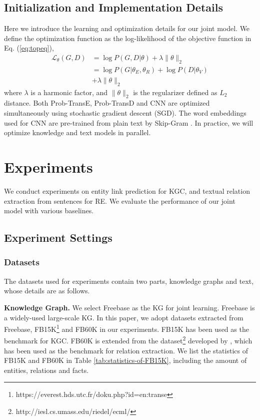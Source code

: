 \documentclass[letterpaper]{article} %
\begin{document}
\subsection{Initialization and Implementation Details}
\label{sec:detail}
Here we introduce the learning and optimization details for our joint model. We define the optimization function as the log-likelihood of the objective function in Eq. (\ref{eq:topeq}),
\begin{align}
\mathcal{L}_{\theta}(G, D) & = \log P(G,D|{\theta}) + \lambda \lVert \theta \rVert_2 \\\nonumber
 & = \log P(G|{\theta_E, \theta_R}) + \log P(D|{\theta_V}) \\\nonumber
 & + \lambda \lVert \theta \rVert_2
\end{align}
where $\lambda$ is a harmonic factor, and $\lVert \theta \rVert_2$ is the regularizer defined as $L_2$ distance. Both Prob-TransE, Prob-TransD and CNN are optimized simultaneously using stochastic gradient descent (SGD). The word embeddings used for CNN are pre-trained from plain text by Skip-Gram \cite{mikolov2013efficient}. In practice, we will optimize knowledge and text models in parallel. 


\section{Experiments}
\label{sec:experiments}

We conduct experiments on entity link prediction for KGC, and textual relation extraction from sentences for RE. We evaluate the performance of our joint model with various baselines. 


\subsection{Experiment Settings}



\subsubsection{Datasets}

The datasets used for experiments contain two parts, knowledge graphs and text, whose details are as follows.

\textbf{Knowledge Graph.} We select Freebase \cite{bollacker2008freebase} as the KG for joint learning. Freebase is a widely-used large-scale KG. In this paper, we adopt datasets extracted from Freebase, FB15K\footnote{https://everest.hds.utc.fr/doku.php?id=en:transe} and FB60K in our experiments. FB15K has been used as the benchmark for KGC. FB60K is extended from the dataset\footnote{http://iesl.cs.umass.edu/riedel/ecml/} developed by \cite{riedel2010modeling}, which has been used as the benchmark for relation extraction. We list the statistics of FB15K and FB60K in Table \ref{tab:statistics-of-FB15K}, including the amount of entities, relations and facts.
\end{document}
